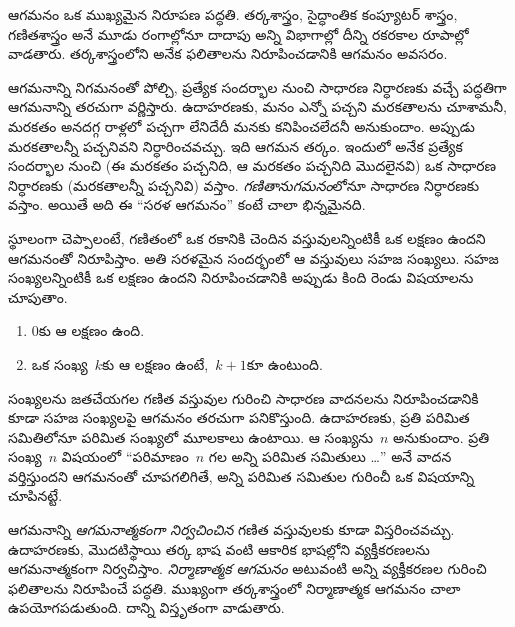 \documentclass[../../../include/open-logic-section]{subfiles}
\begin{document}


ఆగమనం ఒక ముఖ్యమైన నిరూపణ పద్ధతి. తర్కశాస్త్రం, సైద్ధాంతిక
కంప్యూటర్ శాస్త్రం, గణితశాస్త్రం అనే మూడు రంగాల్లోనూ దాదాపు
అన్ని విభాగాల్లో దీన్ని రకరకాల రూపాల్లో వాడతారు. తర్కశాస్త్రంలోని
అనేక ఫలితాలను నిరూపించడానికి ఆగమనం అవసరం.

ఆగమనాన్ని నిగమనంతో పోల్చి, ప్రత్యేక
సందర్భాల నుంచి సాధారణ నిర్ధారణకు వచ్చే పద్ధతిగా ఆగమనాన్ని తరచుగా
వర్ణిస్తారు. ఉదాహరణకు, మనం ఎన్నో పచ్చని మరకతాలను చూశామనీ,
మరకతం అనదగ్గ రాళ్లలో పచ్చగా లేనిదేదీ మనకు కనిపించలేదనీ అనుకుందాం.
అప్పుడు మరకతాలన్నీ పచ్చనివని నిర్ధారించవచ్చు. ఇది ఆగమన తర్కం.
ఇందులో అనేక ప్రత్యేక సందర్భాల నుంచి (ఈ మరకతం పచ్చనిది, ఆ
మరకతం పచ్చనిది మొదలైనవి) ఒక సాధారణ నిర్ధారణకు (మరకతాలన్నీ
పచ్చనివి) వస్తాం. \emph{గణితానుగమనం}లోనూ సాధారణ నిర్ధారణకు
వస్తాం. అయితే అది ఈ ``సరళ ఆగమనం'' కంటే చాలా భిన్నమైనది.

స్థూలంగా చెప్పాలంటే, గణితంలో ఒక రకానికి చెందిన వస్తువులన్నింటికీ
ఒక లక్షణం ఉందని ఆగమనంతో నిరూపిస్తాం. అతి సరళమైన సందర్భంలో
ఆ వస్తువులు సహజ సంఖ్యలు. సహజ సంఖ్యలన్నింటికీ ఒక లక్షణం ఉందని
నిరూపించడానికి అప్పుడు కింది రెండు విషయాలను చూపుతాం.
\begin{enumerate}
    \item $0$కు ఆ లక్షణం ఉంది.
    \item ఒక సంఖ్య~$k$కు ఆ లక్షణం ఉంటే,~$k+1$కూ ఉంటుంది.
\end{enumerate}
సంఖ్యలను జతచేయగల గణిత వస్తువుల గురించి సాధారణ వాదనలను
నిరూపించడానికి కూడా సహజ సంఖ్యలపై ఆగమనం తరచుగా పనికొస్తుంది.
ఉదాహరణకు, ప్రతి పరిమిత సమితిలోనూ పరిమిత సంఖ్యలో మూలకాలు
ఉంటాయి. ఆ సంఖ్యను~$n$ అనుకుందాం. ప్రతి సంఖ్య~$n$ విషయంలో
``పరిమాణం~$n$ గల అన్ని పరిమిత సమితులు \dots'' అనే వాదన
వర్తిస్తుందని ఆగమనంతో చూపగలిగితే, అన్ని పరిమిత సమితుల
గురించీ ఒక విషయాన్ని చూపినట్టే.

ఆగమనాన్ని \emph{ఆగమనాత్మకంగా నిర్వచించిన} గణిత వస్తువులకు కూడా విస్తరించవచ్చు. ఉదాహరణకు, మొదటిస్థాయి తర్క భాష వంటి ఆకారిక భాషల్లోని వ్యక్తీకరణలను ఆగమనాత్మకంగా నిర్వచిస్తాం. \emph{నిర్మాణాత్మక ఆగమనం} అటువంటి అన్ని వ్యక్తీకరణల గురించి ఫలితాలను నిరూపించే పద్ధతి. ముఖ్యంగా తర్కశాస్త్రంలో నిర్మాణాత్మక ఆగమనం చాలా ఉపయోగపడుతుంది. దాన్ని విస్తృతంగా వాడుతారు.
\end{document}
